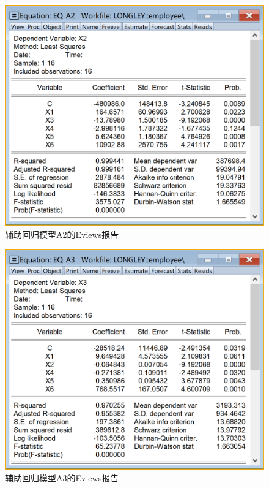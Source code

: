 \documentclass[12pt,(landscape,a4paper),(portrait,a4paper)]{article}
\begin{document}
\begin{figure}

{\centering \includegraphics[width=8in]{picture/lab5-multilinearity/3-A2} 

}

\caption{辅助回归模型A2的Eviews报告}\label{fig:fig-A2}
\end{figure}

\begin{figure}

{\centering \includegraphics[width=8in]{picture/lab5-multilinearity/3-A3} 

}

\caption{辅助回归模型A3的Eviews报告}\label{fig:fig-A3}
\end{figure}
\end{document}
